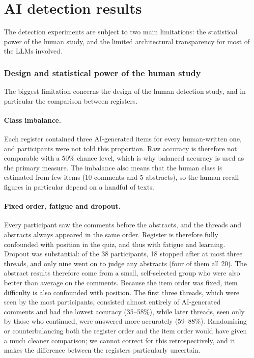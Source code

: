 \documentclass[thesis]{cluu}
\begin{document}
\section{AI detection results}

The detection experiments are subject to two main limitations: the statistical power of the human study, and the limited architectural transparency for most of the LLMs involved.

\subsubsection{Design and statistical power of the human study}
\label{sec:human-study-limitations}
The biggest limitation concerns the design of the human detection study, and in particular the comparison between registers.

\paragraph{Class imbalance.} Each register contained three AI-generated items for every human-written one, and participants were not told this proportion. Raw accuracy is therefore not comparable with a 50\% chance level, which is why balanced accuracy is used as the primary measure. The imbalance also means that the human class is estimated from few items (10 comments and 5 abstracts), so the human recall figures in particular depend on a handful of texts.

\paragraph{Fixed order, fatigue and dropout.} Every participant saw the comments before the abstracts, and the threads and abstracts always appeared in the same order. Register is therefore fully confounded with position in the quiz, and thus with fatigue and learning. Dropout was substantial: of the 38 participants, 18 stopped after at most three threads, and only nine went on to judge any abstracts (four of them all 20). The abstract results therefore come from a small, self-selected group who were also better than average on the comments. Because the item order was fixed, item difficulty is also confounded with position. The first three threads, which were seen by the most participants, consisted almost entirely of AI-generated comments and had the lowest accuracy (35--58\%), while later threads, seen only by those who continued, were answered more accurately (59--88\%). Randomising or counterbalancing both the register order and the item order would have given a much cleaner comparison; we cannot correct for this retrospectively, and it makes the difference between the registers particularly uncertain.
\end{document}
